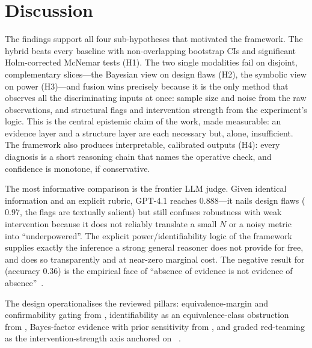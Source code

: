 \section{Discussion}
\label{sec:discussion}

 The findings support all four sub-hypotheses that
motivated the framework. The hybrid beats every baseline with non-overlapping
bootstrap CIs and significant Holm-corrected McNemar tests (H1). The two single
modalities fail on disjoint, complementary slices---the Bayesian view on design
flaws (H2), the symbolic view on power (H3)---and fusion wins precisely because it
is the only method that observes all the discriminating inputs at once: sample
size and noise from the raw observations, and structural flags and intervention
strength from the experiment's logic. This is the central epistemic claim of the
work, made measurable: an evidence layer and a structure layer are each necessary
but, alone, insufficient. The framework also produces interpretable, calibrated
outputs (H4): every diagnosis is a short reasoning chain that names the operative
check, and confidence is monotone, if conservative.

 The most informative comparison is the
frontier LLM judge. Given identical information and an explicit rubric, GPT-4.1
reaches $0.888$---it nails design flaws ($0.97$, the flags are textually salient)
but still confuses robustness with weak intervention because it does not reliably
translate a small $N$ or a noisy metric into ``underpowered''. The explicit
power/identifiability logic of the framework supplies exactly the inference a
strong general reasoner does not provide for free, and does so transparently and
at near-zero marginal cost. The negative result for \nhst{} (accuracy $0.36$) is
the empirical face of ``absence of evidence is not evidence of
absence''~\citep{dale2024confirming}.

 The design operationalises the reviewed
pillars: equivalence-margin and confirmability gating from
\citet{dale2024confirming}, identifiability as an equivalence-class obstruction
from \citet{santosgrueiro2026limits}, Bayes-factor evidence with prior sensitivity
from \citet{rouder2009bayesian, robert2016demise}, and graded red-teaming as the
intervention-strength axis anchored on \harmbench~\citep{mazeika2024harmbench}.

